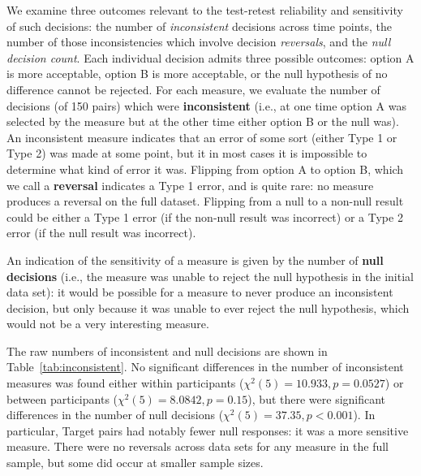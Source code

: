 \documentclass[doc]{apa6}
\newcommand{\targchoice}{{\sc Target pairs}}
\newcommand{\initial}{{\sc initial}}
\begin{document}
We examine three outcomes relevant to the test-retest reliability and sensitivity of such decisions: the number of {\it inconsistent} decisions across time points, the number of those inconsistencies which involve decision {\it reversals}, and the {\it null decision count}. Each individual decision admits three possible outcomes: option A is more acceptable, option B is more acceptable, or the null hypothesis of no difference cannot be rejected. For each measure, we evaluate the number of decisions (of 150 pairs) which were {\bf inconsistent} (i.e., at one time option A was selected by the measure but at the other time either option B or the null was). An inconsistent measure indicates that an error of some sort (either Type 1 or Type 2) was made at some point, but it in most cases it is impossible to determine what kind of error it was. Flipping from option A to option B, which we call a {\bf reversal} indicates a Type 1 error, and is quite rare: no measure produces a reversal on the full dataset. Flipping from a null to a non-null result could be either a Type 1 error (if the non-null result was incorrect) or a Type 2 error (if the null result was incorrect).

An indication of the sensitivity of a measure is given by the number of {\bf null decisions} (i.e., the measure was unable to reject the null hypothesis in the \initial{} data set): it would be possible for a measure to never produce an inconsistent decision, but only because it was unable to ever reject the null hypothesis, which would not be a very interesting measure.

The raw numbers of inconsistent and null decisions are shown in Table~\ref{tab:inconsistent}. No significant differences in the number of inconsistent measures was found either within participants ($\chi^2{(5)}=10.933,p=0.0527$) or between participants ($\chi^2{(5)}=8.0842,p=0.15$), but there were significant differences in the number of null decisions ($\chi^2{(5)}=37.35,p<0.001$). In particular, \targchoice{} had notably fewer null responses: it was a more sensitive measure. There were no reversals across data sets for any measure in the full sample, but some did occur at smaller sample sizes.
\end{document}
